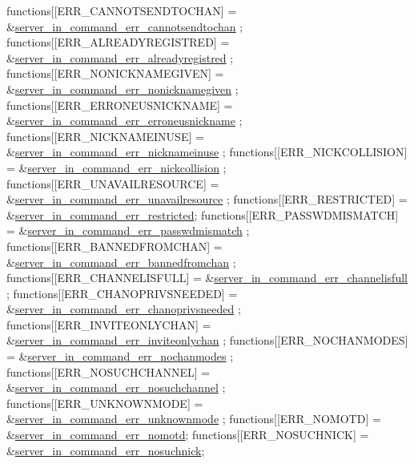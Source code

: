 \begin{DoxyCode}
functions[[ERR\_CANNOTSENDTOCHAN]       = &\hyperlink{G-2313-06-P2__client__err__handlers_8h_aee5973ae831d1c7c63b1a62b59f561c2}{server\_in\_command\_err\_cannotsendtochan}
      ;
functions[[ERR\_ALREADYREGISTRED]       = &\hyperlink{G-2313-06-P2__client__err__handlers_8h_a14bfb17eb95d0f2bef1869aa2ebf520c}{server\_in\_command\_err\_alreadyregistred}
      ;
functions[[ERR\_NONICKNAMEGIVEN]        = &\hyperlink{G-2313-06-P2__client__err__handlers_8h_aaa9cfb1b5050bd1218c227d8d0a041fe}{server\_in\_command\_err\_nonicknamegiven}
      ;
functions[[ERR\_ERRONEUSNICKNAME]       = &\hyperlink{G-2313-06-P2__client__err__handlers_8h_abeb8ead21ebba982eb59f161eda735cb}{server\_in\_command\_err\_erroneusnickname}
      ;
functions[[ERR\_NICKNAMEINUSE]          = &\hyperlink{G-2313-06-P2__client__err__handlers_8h_ab6d8f2d05566bf6ee9dfcfc4a20f5d23}{server\_in\_command\_err\_nicknameinuse}
      ;
functions[[ERR\_NICKCOLLISION]          = &\hyperlink{G-2313-06-P2__client__err__handlers_8h_a4af95b292b293c08c0989b4e7334c7eb}{server\_in\_command\_err\_nickcollision}
      ;
functions[[ERR\_UNAVAILRESOURCE]        = &\hyperlink{G-2313-06-P2__client__err__handlers_8h_ae4fcb567dc7685f5d7a4abbc7c6506b4}{server\_in\_command\_err\_unavailresource}
      ;
functions[[ERR\_RESTRICTED]             = &\hyperlink{G-2313-06-P2__client__err__handlers_8h_ada432444f58d5effbb05fd558a8ce289}{server\_in\_command\_err\_restricted};
functions[[ERR\_PASSWDMISMATCH]         = &\hyperlink{G-2313-06-P2__client__err__handlers_8h_a548a7ad35236521dca4b829e466f3379}{server\_in\_command\_err\_passwdmismatch}
      ;
functions[[ERR\_BANNEDFROMCHAN]         = &\hyperlink{G-2313-06-P2__client__err__handlers_8h_a0e4059ef132eaac2218fdd89b20ca852}{server\_in\_command\_err\_bannedfromchan}
      ;
functions[[ERR\_CHANNELISFULL]          = &\hyperlink{G-2313-06-P2__client__err__handlers_8h_a05db0aa32f2ec2925cba3b952435bf59}{server\_in\_command\_err\_channelisfull}
      ;
functions[[ERR\_CHANOPRIVSNEEDED]       = &\hyperlink{G-2313-06-P2__client__err__handlers_8h_a9fcb3f66fbcc994c7a78b36ebc0fe63d}{server\_in\_command\_err\_chanoprivsneeded}
      ;
functions[[ERR\_INVITEONLYCHAN]         = &\hyperlink{G-2313-06-P2__client__err__handlers_8h_ae5512c3dd8e1584fd8bafc4f5dd15d8c}{server\_in\_command\_err\_inviteonlychan}
      ;
functions[[ERR\_NOCHANMODES]            = &\hyperlink{G-2313-06-P2__client__err__handlers_8h_aade31864807344a9961ffdab697b5727}{server\_in\_command\_err\_nochanmodes}
      ;
functions[[ERR\_NOSUCHCHANNEL]          = &\hyperlink{G-2313-06-P2__client__err__handlers_8h_a83109e15e2a8f93c9523a84a546098c0}{server\_in\_command\_err\_nosuchchannel}
      ;
functions[[ERR\_UNKNOWNMODE]            = &\hyperlink{G-2313-06-P2__client__err__handlers_8h_af262f3569e06c21e3e466266fa4e2c80}{server\_in\_command\_err\_unknownmode}
      ;
functions[[ERR\_NOMOTD]                 = &\hyperlink{G-2313-06-P2__client__err__handlers_8h_a678f368edc1fd437f5f115ef897bdcd9}{server\_in\_command\_err\_nomotd};
functions[[ERR\_NOSUCHNICK]             = &\hyperlink{G-2313-06-P2__client__err__handlers_8h_a01f8c9822aac18d5424ebbaf67c06a51}{server\_in\_command\_err\_nosuchnick};
\end{DoxyCode}
